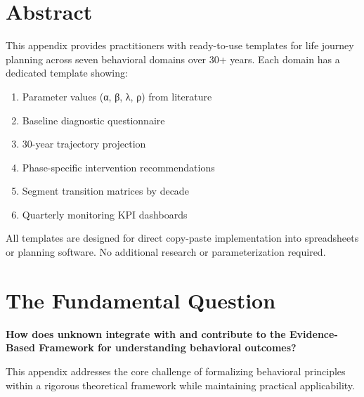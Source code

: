 
\section*{Abstract}

This appendix provides practitioners with ready-to-use templates for life journey planning across seven behavioral domains over 30+ years. Each domain has a dedicated template showing:
\begin{enumerate}[nosep]
\item Parameter values (α, β, λ, ρ) from literature
\item Baseline diagnostic questionnaire
\item 30-year trajectory projection
\item Phase-specific intervention recommendations
\item Segment transition matrices by decade
\item Quarterly monitoring KPI dashboards
\end{enumerate}

All templates are designed for direct copy-paste implementation into spreadsheets or planning software. No additional research or parameterization required.


\section{The Fundamental Question}
\label{sec:rrr-fundamental}

\begin{tcolorbox}[
    colback=red!5!white,
    colframe=red!75!black,
    title={\textbf{Fundamental Question}}
]
\textbf{How does unknown integrate with and contribute to the
Evidence-Based Framework for understanding behavioral outcomes?}

This appendix addresses the core challenge of formalizing behavioral principles
within a rigorous theoretical framework while maintaining practical applicability.
\end{tcolorbox}


